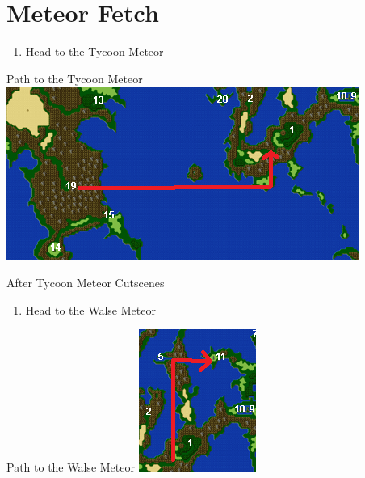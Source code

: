 \chapter{Meteor Fetch}

\vspace{\baselineskip}

\begin{paracol}{2}

\begin{enumerate}
    \item Head to the Tycoon Meteor
\end{enumerate}

\switchcolumn
\begin{misc}{Path to the Tycoon Meteor}
    \includegraphics[scale=0.75]{../Graphics/Maps/7. To Tycoon Meteor.png}
\end{misc}

\begin{steproute}{After Tycoon Meteor Cutscenes}
\end{steproute}

\switchcolumn*
\begin{enumerate}[resume]
    \item Head to the Walse Meteor
\end{enumerate}

\switchcolumn
\begin{misc}{Path to the Walse Meteor}
    \includegraphics{../Graphics/Maps/8. To Walse Meteor.png}
\end{misc}


\end{paracol}
